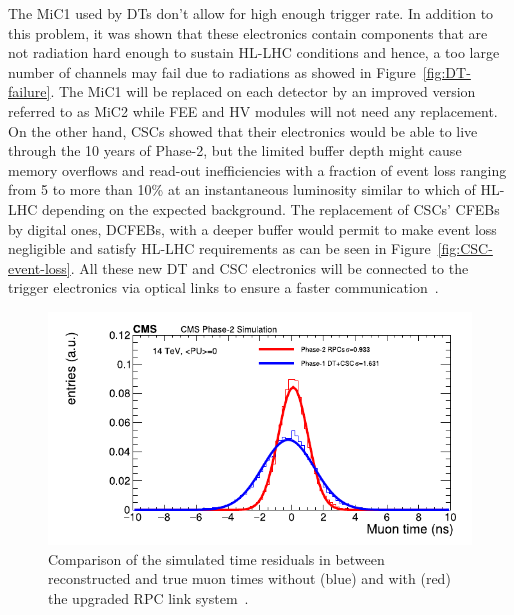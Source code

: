 	The \acf{MiC1} used by DTs don't allow for high enough trigger rate. In addition to this problem, it was shown that these electronics contain components that are not radiation hard enough to sustain HL-LHC conditions and hence, a too large number of channels may fail due to radiations as showed in Figure~\ref{fig:DT-failure}. The MiC1 will be replaced on each detector by an improved version referred to as MiC2 while \acf{FEE} and \acf{HV} modules will not need any replacement. On the other hand, CSCs showed that their electronics would be able to live through the 10 years of Phase-2, but the limited buffer depth might cause memory overflows and read-out inefficiencies with a fraction of event loss ranging from 5 to more than 10\% at an instantaneous luminosity similar to which of HL-LHC depending on the expected background. The replacement of CSCs' CFEBs by digital ones, DCFEBs, with a deeper buffer would permit to make event loss negligible and satisfy HL-LHC requirements as can be seen in Figure~\ref{fig:CSC-event-loss}. All these new DT and CSC electronics will be connected to the trigger electronics via optical links to ensure a faster communication~\cite{PHASEIITP}.
	
\endgroup

\begingroup\setlength{\intextsep}{0pt}\setlength{\columnsep}{15pt}

	\begin{figure}
		\centering
		\includegraphics[width=\linewidth]{fig/chapt4/RPC-ugrade-LS.pdf}
		\caption{\label{fig:RPC-time} Comparison of the simulated time residuals in between reconstructed and true muon times without (blue) and with (red) the upgraded RPC link system~\cite{PHASEIITP}.}
	\end{figure}
	
